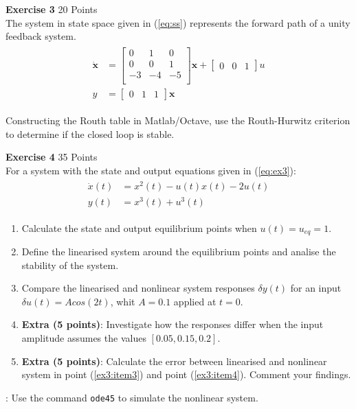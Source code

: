 \documentclass[a4paper,11pt]{article}
\begin{document}
\vskip0.5cm

{\Large \noindent \bf Exercise 3} \hfill					20 Points\\

\noindent The system in state space given in (\ref{eq:ss}) represents the forward path of a unity feedback system. 
\begin{align}
\begin{split}
\mathbf{\dot{x}} & =\begin{bmatrix}
0 & 1 & 0\\
0 & 0 & 1\\
-3 & -4 & -5\\
\end{bmatrix}
\mathbf{x}+\begin{bmatrix}
0 & 0 & 1
\end{bmatrix}
u \\
y & = \begin{bmatrix}
0 & 1 & 1
\end{bmatrix}
\mathbf{x}
\end{split}
\label{eq:ss}
\end{align}

\noindent Constructing the Routh table in Matlab/Octave, use the Routh-Hurwitz criterion to determine if the closed loop is stable.

\vskip0.5cm
{\Large \noindent \bf Exercise 4} \hfill					35 Points\\

\noindent  For a system with the state and output equations given in (\ref{eq:ex3}):
\begin{align}
\begin{split}
\dot{x}(t)& =x^2(t)-u(t)x(t)-2u(t)\\
y(t)& =x^3(t)+u^3(t)
\end{split}
\label{eq:ex3}
\end{align}  

\begin{enumerate}
\item Calculate the state and output equilibrium points when $u(t)=u_{eq}=1$.
\item Define the linearised system around the equilibrium points and analise the stability of the system.
\item \label{ex3:item3} Compare the linearised and nonlinear system responses $\delta y(t)$ for an input $\delta u(t)=A cos(2t)$, whit $A=0.1$ applied at $t=0$.
\item \label{ex3:item4} {\bf Extra (5 points)}: Investigate how the responses differ when the input amplitude assumes the values $[0.05, 0.15, 0.2]$. 
\item {\bf Extra (5 points)}: Calculate the error between linearised and nonlinear system in point (\ref{ex3:item3}) and point (\ref{ex3:item4}). Comment your findings.
\end{enumerate}

: Use the command {\tt ode45} to simulate the nonlinear system.
\end{document}
